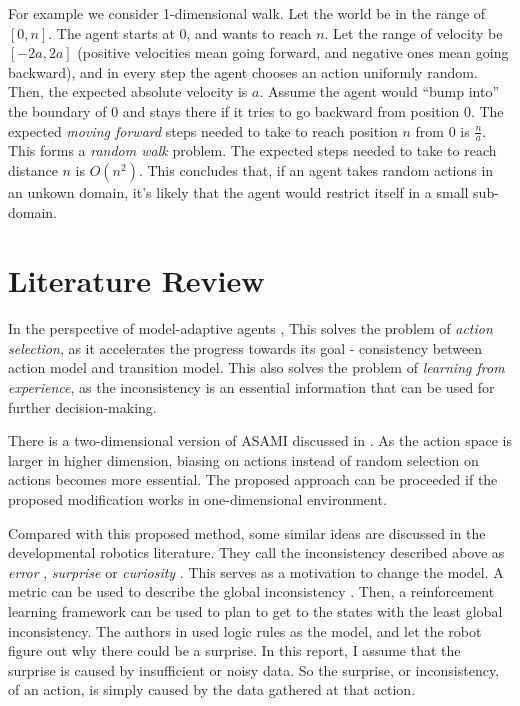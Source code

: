 \documentclass[10pt]{IEEEtran}
\begin{document}
For example we consider 1-dimensional walk. Let the world be in the
range of $[0,n]$. The agent starts at 0, and wants to reach $n$. Let
the range of velocity be $[-2a, 2a]$ (positive velocities mean going
forward, and negative ones mean going backward), and in every step the
agent chooses an action uniformly random.  Then, the expected absolute
velocity is $a$. Assume the agent would ``bump into'' the boundary of
$0$ and stays there if it tries to go backward from position $0$. The
expected \textit{moving forward} steps needed to take to reach
position $n$ from $0$ is $\frac{n}{a}$. This forms a \textit{random walk}
\cite{motwani1995randomized} problem. The expected steps needed to
take to reach distance $n$ is $O(n^2)$. This concludes that, if an
agent takes random actions in an unkown domain, it's likely that the
agent would restrict itself in a small sub-domain.

\section{Literature Review}

In the perspective of model-adaptive agents \cite{maes1993modeling},
This solves the problem of \textit{action selection}, as it
accelerates the progress towards its goal - consistency between action
model and transition model. This also solves the problem of
\textit{learning from experience}, as the inconsistency is an
essential information that can be used for further decision-making.

There is a two-dimensional version of ASAMI discussed in
\cite{ICRA08-stronger}.  As the action space is larger in higher
dimension, biasing on actions instead of random selection on actions
becomes more essential. The proposed approach can be proceeded if the
proposed modification works in one-dimensional environment.

Compared with this proposed method, some similar ideas are discussed
in the developmental robotics literature. They call the inconsistency
described above as \textit{error} \cite{oudeyer2006discovering},
\textit{surprise} \cite{ranasinghe2008surprise} or \textit{curiosity}
\cite{schmidhuber2006developmental}. This serves as a motivation to
change the model. A metric can be used to describe the global
inconsistency \cite{oudeyer2006discovering}. Then, a reinforcement
learning framework can be used to plan to get to the states with the
least global inconsistency. The authors in
\cite{ranasinghe2008surprise} used logic rules as the model, and let
the robot figure out why there could be a surprise. In this report, I
assume that the surprise is caused by insufficient or noisy data. So
the surprise, or inconsistency, of an action, is simply caused by the
data gathered at that action.
\end{document}

